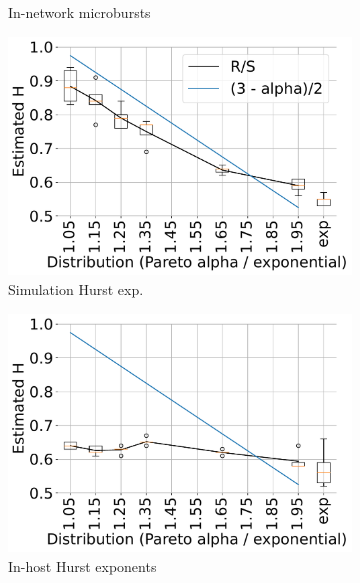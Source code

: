 \begin{figure}[t]
\begin{subfigure}[t]{0.32\linewidth}
    \caption{In-network microbursts}
	\label{fig:filecdf-testbed}
\end{subfigure}
\begin{subfigure}[t]{0.32\linewidth}
    \centering
    	\includegraphics[width=1\linewidth]{figs/filehurst_sim.pdf}
    \caption{Simulation Hurst exp.}
	\label{fig:filehurst-sim}
\end{subfigure}
\begin{subfigure}[t]{0.32\linewidth}
    \centering
    \includegraphics[width=1\linewidth]{figs/filehurst_ebpf_testbed.pdf}
    \caption{In-host Hurst exponents}
	\label{fig:fhurst-ebpf}
\end{subfigure}
\centering
\begin{subfigure}[t]{0.32\linewidth}
    \centering

\end{subfigure}
\end{figure}
